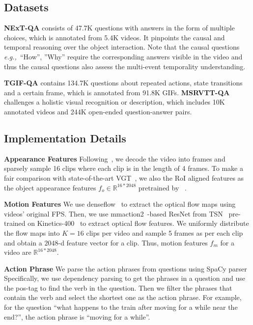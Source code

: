 \documentclass[sigconf]{acmart}
\newcommand{\eg}{\emph{e.g.,~}}
\begin{document}
 
\subsection{Datasets}



\textbf{NExT-QA} \cite{xiao2021next} consists of 47.7K questions with answers in the form of multiple choices, which is annotated from 5.4K videos. It pinpoints the causal and temporal reasoning over the object interaction. 
Note that the causal questions \eg ``How'', ''Why'' require the corresponding answers visible in the video and thus the causal questions also assess the multi-event temporality understanding.


\textbf{TGIF-QA} \cite{jang2017tgif} contains 134.7K questions about repeated actions, state transitions and a certain frame, which is annotated from 91.8K GIFs. 
\textbf{MSRVTT-QA} \cite{xu2017video} challenges a holistic visual recognition or description, which includes 10K annotated videos and 244K open-ended question-answer pairs.  

\subsection{Implementation Details}

\textbf{Appearance Features}
Following~\cite{xiao2022vgt,xiao2022hqga}, we decode the video into frames and sparsely sample 16 clips where each clip is in the length of 4 frames. 
To make a fair comparison with state-of-the-art VGT~\cite{xiao2022vgt}, we also the RoI aligned features as the object appearance features $f_o \in \mathbb{R}^{16*2048}$ pretrained by ~\cite{anderson2018bottom}. 

 
\textbf{Motion Features}
We use denseflow~\cite{denseflow} to extract the optical flow maps using videos' original FPS. Then, we use mmaction2~\cite{2020mmaction2}-based ResNet from TSN~\cite{wang2016temporal} pre-trained on Kinetics-400~\cite{carreira2017quo} to extract optical flow features. 
We uniformly distribute the flow maps into $K=16$ clips per video and sample 5 frames as per each clip and obtain a $2048$-d feature vector for a clip. Thus, motion features $f_m$ for a video are $\mathbb{R}^{16*2048}$.


\textbf{Action Phrase}
We parse the action phrases from questions using SpaCy parser~\cite{spacy2} Specifically, we use dependency parsing to get the phrases in a question and use the pos-tag to find the verb in the question. Then we filter the phrases that contain the verb and select the shortest one as the action phrase. For example, for the question ``what happens to the train after moving for a while near the end?'', the action phrase is ``moving for a while''.
\end{document}
